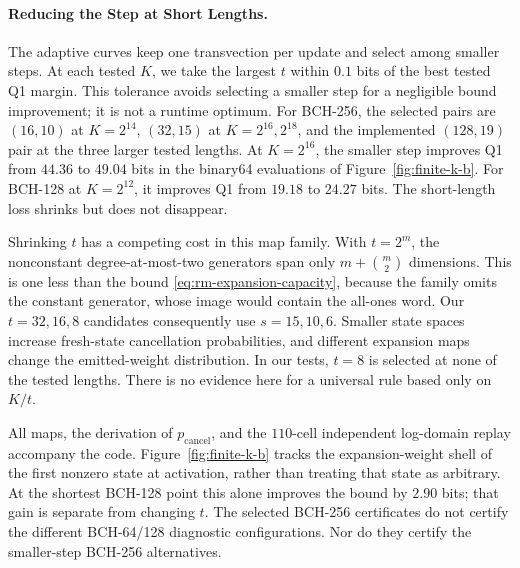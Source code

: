 \paragraph{Reducing the Step at Short Lengths.}
The adaptive curves keep one transvection per update and select among
smaller steps. At each tested $K$, we take the largest $t$ within $0.1$
bits of the best tested Q1 margin. This tolerance avoids selecting a
smaller step for a negligible bound improvement; it is not a runtime optimum.
For BCH-256, the selected pairs are $(16,10)$ at $K=2^{14}$, $(32,15)$
at $K=2^{16},2^{18}$, and the implemented $(128,19)$ pair at the three
larger tested lengths. At $K=2^{16}$, the smaller step improves Q1 from
$44.36$ to $49.04$ bits in the binary64 evaluations of
Figure~\ref{fig:finite-k-b}. For BCH-128 at $K=2^{12}$, it improves Q1 from
$19.18$ to $24.27$ bits. The short-length loss shrinks but does not disappear.

Shrinking $t$ has a competing cost in this map family. With $t=2^m$,
the nonconstant degree-at-most-two generators span only $m+\binom m2$
dimensions. This is one less than the bound
\eqref{eq:rm-expansion-capacity}, because the family omits the constant
generator, whose image would contain the all-ones word.
Our $t=32,16,8$ candidates consequently use $s=15,10,6$.
Smaller state spaces increase fresh-state cancellation probabilities, and
different expansion maps change the emitted-weight distribution.
In our tests, $t=8$ is selected at none of the tested lengths.
There is no evidence here for a universal rule based only on $K/t$.

All maps, the derivation of $p_{\mathrm{cancel}}$, and the $110$-cell
independent log-domain replay accompany the code\repositorycite.
Figure~\ref{fig:finite-k-b} tracks the expansion-weight shell of the first
nonzero state at activation, rather than treating that state as arbitrary.
At the shortest BCH-128 point this alone improves the bound by $2.90$ bits;
that gain is separate from changing $t$.
The selected BCH-256 certificates do not certify the different BCH-64/128 diagnostic configurations.
Nor do they certify the smaller-step BCH-256 alternatives.

